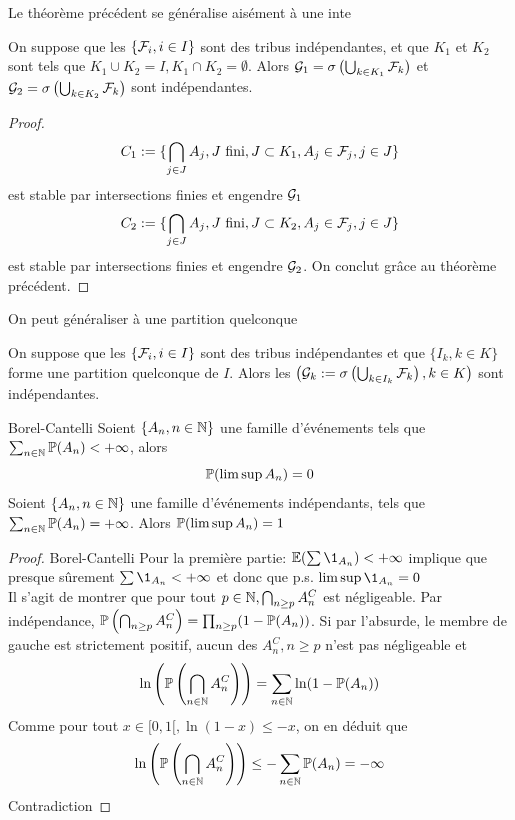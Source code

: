\documentclass[]{report}
\begin{document}
Le théorème précédent se généralise aisément à une inte

\begin{tm}{}{}
    On suppose que les $\{\mathcal{F}_i,i\in I\}$ sont des tribus indépendantes, et que $K_1$ et $K_2$ sont tels que $K_1\cup K_2=I,K_1\cap K_2=\emptyset$. Alors $\mathcal{G}_1=\sigma\left(\bigcup_{k\in K_1}\mathcal{F}_k\right)$ et $\mathcal{G}_2=\sigma\left(\bigcup_{k\in K_2}\mathcal{F}_k\right)$ sont indépendantes.
\end{tm}

\begin{proof}{}{}
    \[C_1:=\{\bigcap_{j\in J} A_j,J\text{ fini},J\subset K_1,A_j\in \mathcal{F}_j,j\in J\}\]
    est stable par intersections finies et engendre $\mathcal{G}_1$
    \[C_2:=\{\bigcap_{j\in J} A_j,J\text{ fini},J\subset K_2,A_j\in \mathcal{F}_j,j\in J\}\]
    est stable par intersections finies et engendre $\mathcal{G}_2$. On conclut grâce au théorème précédent.
\end{proof}

On peut généraliser à une partition quelconque

\begin{tm}{}{}
    On suppose que les $\{\mathcal{F}_i,i\in I\}$ sont des tribus indépendantes et que $\{I_k,k\in K\}$ forme une partition quelconque de $I$. Alors les $\left(\mathcal{G}_k:=\sigma\left(\bigcup_{k\in I_k} \mathcal{F}_k\right),k\in K\right)$ sont indépendantes.
\end{tm}

\begin{lm}{Borel-Cantelli}{}
    Soient $\{A_n,n\in \mathbb{N}\}$ une famille d'événements tels que $\sum_{n\in \mathbb{N}}\mathbb{P}(A_n)<+\infty$, alors
    \[\mathbb{P}(\limsup A_n)=0\]
    Soient $\{A_n,n\in \mathbb{N}\}$ une famille d'événements indépendants, tels que $\sum_{n\in\mathbb{N}}\mathbb{P}(A_n)=+\infty$. Alors $\mathbb{P}(\limsup A_n)=1$
\end{lm}

\begin{proof}{Borel-Cantelli}{}
    Pour la première partie: $\Ea(\sum \1_{A_n})<+\infty$ implique que presque sûrement $\sum \1_{A_n}<+\infty$ et donc que p.s. $\limsup \1_{A_n}=0$\\
    Il s'agit de montrer que pour tout $p\in \mathbb{N},\bigcap_{n\ge p} A_n^C$ est négligeable. Par indépendance, $\mathbb{P}\left(\bigcap_{n\ge p}A_n^C\right)=\prod_{n\ge p}(1-\mathbb{P}(A_n))$. Si par l'absurde, le membre de gauche est strictement positif, aucun des $A_n^C,n\ge p$ n'est pas négligeable et
    \[\ln \left(\mathbb{P}\left(\bigcap_{n\in\mathbb{N}}A_n^C\right)\right)=\sum_{n\in\mathbb{N}} \ln(1-\mathbb{P}(A_n))\]
    Comme pour tout $x\in [0,1[,\ln(1-x)\le -x$, on en déduit que
    \[\ln \left(\mathbb{P}\left(\bigcap_{n\in\mathbb{N}}A_n^C\right)\right)\le -\sum_{n\in \mathbb{N}}\mathbb{P}(A_n)=-\infty\]
    Contradiction
\end{proof}
\end{document}
